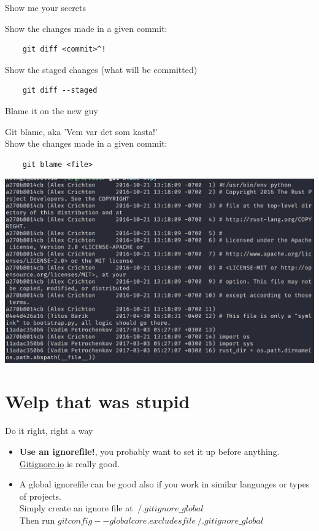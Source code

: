 \documentclass[10pt]{beamer}
\begin{document}
\begin{frame}[fragile]{Show me your secrets}

  Show the changes made in a given commit:
  \begin{lstlisting}
    git diff <commit>^!
  \end{lstlisting}

  Show the staged changes (what will be committed)
  \begin{lstlisting}
    git diff --staged
  \end{lstlisting}
\end{frame}

\begin{frame}[fragile]{Blame it on the new guy}

  Git blame, aka 'Vem var det som kasta!'\\
  Show the changes made in a given commit:
  \begin{lstlisting}
    git blame <file>
  \end{lstlisting}

  \includegraphics[width=\textwidth]{blame}
\end{frame}

\section{Welp that was stupid}
\begin{frame}{Do it right, right a way}
  \begin{itemize}
    \item \textbf{Use an ignorefile!}, you probably want to set it up before anything.\\
      \href{https://gitignore.io/}{Gitignore.io} is really good.
    \item A global ignorefile can be good also if you work in similar languages or types of projects.\\
      Simply create an ignore file at $~/.gitignore\_global$\\
      Then run $git config --global core.excludesfile ~/.gitignore\_global$
  \end{itemize}
\end{frame}
\end{document}

